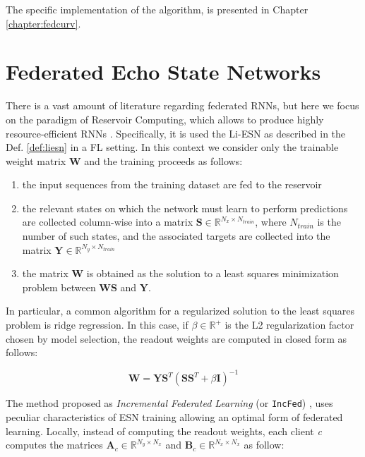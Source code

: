 The specific implementation of the algorithm, is presented in Chapter \ref{chapter:fedcurv}.


\section{Federated Echo State Networks}

There is a vast amount of literature regarding federated RNNs, but here we focus on the paradigm of Reservoir Computing, which allows to produce highly resource-efficient RNNs \cite{bacciu2021federated}. Specifically, it is used the Li-ESN as described in the Def. \ref{def:liesn} in a FL setting. In this context we consider only the trainable weight matrix $\textbf{W}$ and the training proceeds as follows:

\begin{enumerate}
    \item the input sequences from the training dataset are fed to the reservoir
    \item the relevant states on which the network must learn to perform predictions are collected column-wise into a matrix $\textbf{S}\in \mathbb{R}^{N_x\times N_{train}}$, where $N_{train}$ is the number of such states, and the associated targets are collected into the matrix $\textbf{Y}\in \mathbb{R}^{N_y\times N_{train}}$
    \item the matrix $\textbf{W}$ is obtained as the solution to a least squares minimization problem between $\textbf{WS}$ and $\textbf{Y}$.
\end{enumerate}

In particular, a common algorithm for a regularized solution to the least squares problem is ridge regression. In this case, if $\beta\in \mathbb{R}^+$ is the L2 regularization factor chosen by model selection, the readout weights are computed in closed form as follows:

\begin{equation}\label{eq:pseudo_inv}
    \textbf{W}=\textbf{Y}\textbf{S}^T(\textbf{S}\textbf{S}^T+\beta\textbf{I})^{-1}
\end{equation}

The method proposed as \textit{Incremental Federated Learning} (or \texttt{IncFed}) \cite{bacciu2021federated}, uses peculiar characteristics of ESN training allowing an optimal form of federated learning. Locally, instead of computing the readout weights, each client \textit{c} computes the matrices $\textbf{A}_c\in \mathbb{R}^{N_y\times N_x}$ and $\textbf{B}_c\in \mathbb{R}^{N_x\times N_x}$ as follow:

